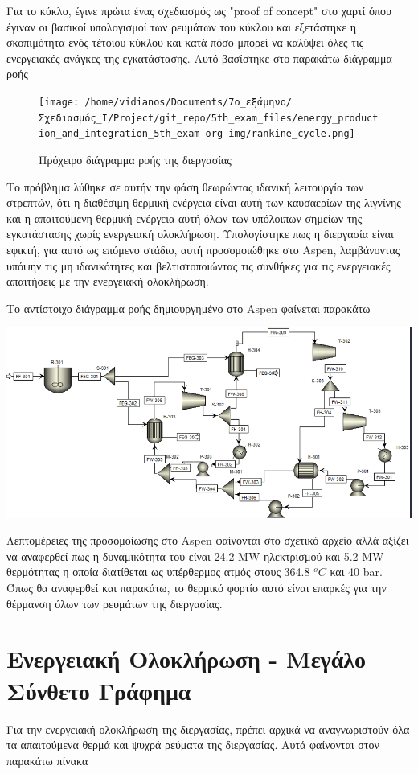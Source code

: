 \documentclass[11pt]{article}
\begin{document}
Για το κύκλο, έγινε πρώτα ένας σχεδιασμός ως "proof of concept" στο χαρτί όπου έγιναν οι βασικοί υπολογισμοί των ρευμάτων του κύκλου και εξετάστηκε η σκοπιμότητα ενός τέτοιου κύκλου και κατά πόσο μπορεί να καλύψει όλες τις ενεργειακές ανάγκες της εγκατάστασης. Αυτό βασίστηκε στο παρακάτω διάγραμμα ροής
\begin{figure}[htbp]
\centering
\texttt{[image: /home/vidianos/Documents/7o\_εξάμηνο/Σχεδιασμός\_Ι/Project/git\_repo/5th\_exam\_files/energy\_production\_and\_integration\_5th\_exam-org-img/rankine\_cycle.png]}
\caption{Πρόχειρο διάγραμμα ροής της διεργασίας}
\end{figure}
Το πρόβλημα λύθηκε σε αυτήν την φάση θεωρώντας ιδανική λειτουργία των στρεπτών, ότι η διαθέσιμη θερμική ενέργεια είναι αυτή των καυσαερίων της λιγνίνης και η απαιτούμενη θερμική ενέργεια αυτή όλων των υπόλοιπων σημείων της εγκατάστασης χωρίς ενεργειακή ολοκλήρωση. Υπολογίστηκε πως η διεργασία είναι εφικτή, για αυτό ως επόμενο στάδιο, αυτή προσομοιώθηκε στο Aspen, λαμβάνοντας υπόψην τις μη ιδανικότητες και βελτιστοποιώντας τις συνθήκες για τις ενεργειακές απαιτήσεις με την ενεργειακή ολοκλήρωση.

Το αντίστοιχο διάγραμμα ροής δημιουργημένο στο Aspen φαίνεται παρακάτω
\begin{center}
\includegraphics[width=.9\linewidth]{Ανάπτυξη_του_block_300_της_διεργασίας/2023-02-26_18-23-52_screenshot.png}
\end{center}

Λεπτομέρειες της προσομοίωσης στο Aspen φαίνονται στο \href{https://github.com/Vidianos-Giannitsis/Process-Design/blob/master/Aspen/lignin\_rankine\_cycle.org}{σχετικό αρχείο} αλλά αξίζει να αναφερθεί πως η δυναμικότητα του είναι 24.2 MW ηλεκτρισμού και 5.2 MW θερμότητας η οποία διατίθεται ως υπέρθερμος ατμός στους 364.8 \(^oC\) και 40 bar. Όπως θα αναφερθεί και παρακάτω, το θερμικό φορτίο αυτό είναι επαρκές για την θέρμανση όλων των ρευμάτων της διεργασίας.

\section{Ενεργειακή Ολοκλήρωση - Μεγάλο Σύνθετο Γράφημα}
\label{sec:org9eba468}
Για την ενεργειακή ολοκλήρωση της διεργασίας, πρέπει αρχικά να αναγνωριστούν όλα τα απαιτούμενα θερμά και ψυχρά ρεύματα της διεργασίας. Αυτά φαίνονται στον παρακάτω πίνακα
\end{document}
